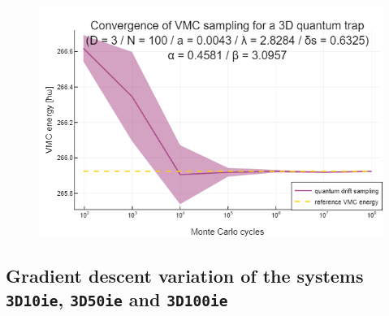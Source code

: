 \documentclass[a4paper,8pt]{article}
\begin{document}
\begin{figure}[h!]
\centering
\includegraphics[height=0.22\textheight]{fig3D100ie_BF_convergence}
\end{figure}

\newpage
\subsection{Gradient descent variation of the systems \texttt{3D10ie}, \texttt{3D50ie} and \texttt{3D100ie}}\label{gdOutput}
\end{document}
